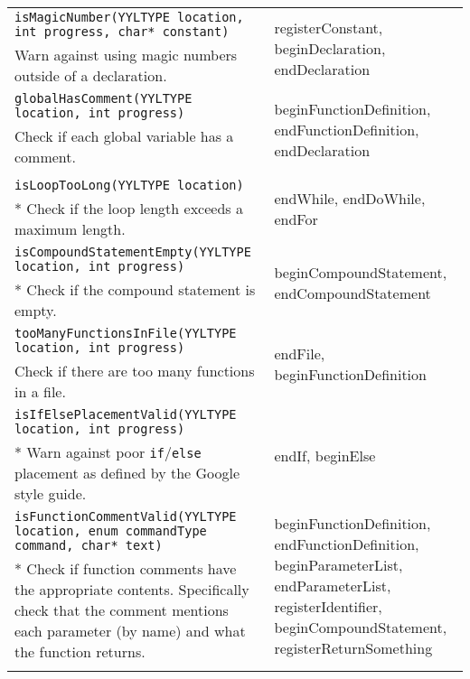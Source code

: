 \documentclass[12pt]{report}
\begin{document}
\begin{longtable}{p{10cm} p{\saxColSize}}
		\lstinline!isMagicNumber(YYLTYPE location, int progress, char* constant)! & \multirow{2}{\saxColSize}{registerConstant, beginDeclaration, endDeclaration} \\*
			 Warn against using magic numbers outside of a declaration. \vspace{\vertSize} \\
		\lstinline!globalHasComment(YYLTYPE location, int progress)! & \multirow{2}{\saxColSize}{beginFunctionDefinition, endFunctionDefinition, endDeclaration} \\*
			 Check if each global variable has a comment. \vspace{\vertSize} \\ \\
		\lstinline!isLoopTooLong(YYLTYPE location)! & \multirow{2}{\saxColSize}{endWhile, endDoWhile, endFor} \\ *
			Check if the loop length exceeds a maximum length. \vspace{\vertSize} \\
		\lstinline!isCompoundStatementEmpty(YYLTYPE location, int progress)!  & \multirow{2}{\saxColSize}{beginCompoundStatement, endCompoundStatement} \\ *
			Check if the compound statement is empty. \vspace{\vertSize} \\
		\lstinline!tooManyFunctionsInFile(YYLTYPE location, int progress)! & \multirow{2}{\saxColSize}{endFile, beginFunctionDefinition} \\*
			 Check if there are too many functions in a file. \vspace{\vertSize} \\
		\lstinline!isIfElsePlacementValid(YYLTYPE location, int progress)! & \multirow{2}{\saxColSize}{endIf, beginElse} \\ *
			Warn against poor \lstinline!if!\slash\lstinline!else! placement as defined by the Google style guide. \vspace{\vertSize} \\
		\lstinline!isFunctionCommentValid(YYLTYPE location, enum commandType command, char* text)! & \multirow{2}{\saxColSize}{beginFunctionDefinition, endFunctionDefinition, beginParameterList, endParameterList, registerIdentifier, beginCompoundStatement, registerReturnSomething} \\ *
			Check if function comments have the appropriate contents. Specifically check that the comment mentions each parameter (by name) and what the function returns. \vspace{\vertSize} \\ \\

\end{longtable}
\end{document}
